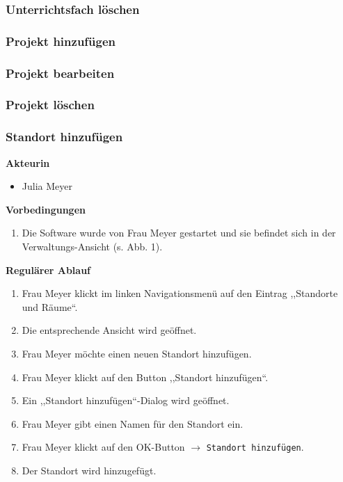 \documentclass[fontsize=12pt,paper=a4,twoside]{scrartcl}
\begin{document}
\subsubsection{Unterrichtsfach löschen}

\subsubsection{Projekt hinzufügen}

\subsubsection{Projekt bearbeiten}

\subsubsection{Projekt löschen}

\subsubsection{Standort hinzufügen}
\textbf{Akteurin}
\begin{itemize}
\item Julia Meyer
\end{itemize}
\vspace{5pt}

\textbf{Vorbedingungen}
\begin{enumerate}
\item Die Software wurde von Frau Meyer gestartet und sie befindet sich in der Verwaltungs-Ansicht (s. Abb. 1).
\end{enumerate}
\vspace{5pt}

\textbf{Regulärer Ablauf}
\begin{enumerate}
\item Frau Meyer klickt im linken Navigationsmenü auf den Eintrag ,,Standorte und Räume``.
\item Die entsprechende Ansicht wird geöffnet.
\item Frau Meyer möchte einen neuen Standort hinzufügen.
\item Frau Meyer klickt auf den Button ,,Standort hinzufügen``.
\item Ein ,,Standort hinzufügen``-Dialog wird geöffnet.
\item Frau Meyer gibt einen Namen für den Standort ein.
\item Frau Meyer klickt auf den OK-Button $\rightarrow$ \texttt{Standort hinzufügen}.
\item Der Standort wird hinzugefügt.
\end{enumerate}
\vspace{5pt}
\end{document}

